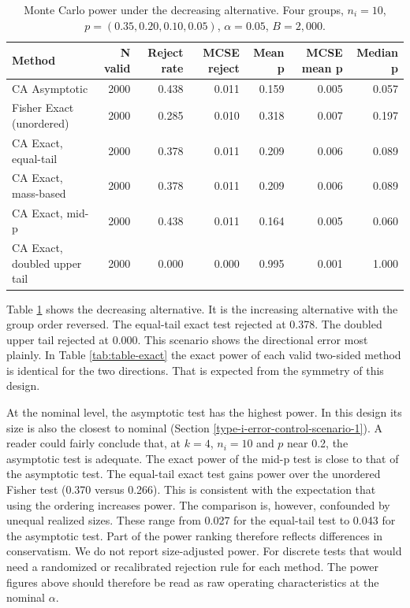 \documentclass[
  11pt,
]{article}
\begin{document}
\begin{table}[!h]
\centering
\caption{\label{tab:table-dec}Monte Carlo power under the decreasing alternative. Four groups, $n_i = 10$, $p = (0.35, 0.20, 0.10, 0.05)$, $\alpha = 0.05$, $B = 2{,}000$.}
\centering
\fontsize{9}{11}\selectfont
\begin{tabular}[t]{lrrrrrr}
\toprule
Method & N valid & Reject rate & MCSE reject & Mean p & MCSE mean p & Median p\\
\midrule
CA Asymptotic & 2000 & 0.438 & 0.011 & 0.159 & 0.005 & 0.057\\
Fisher Exact (unordered) & 2000 & 0.285 & 0.010 & 0.318 & 0.007 & 0.197\\
CA Exact, equal-tail & 2000 & 0.378 & 0.011 & 0.209 & 0.006 & 0.089\\
CA Exact, mass-based & 2000 & 0.378 & 0.011 & 0.209 & 0.006 & 0.089\\
CA Exact, mid-p & 2000 & 0.438 & 0.011 & 0.164 & 0.005 & 0.060\\
\addlinespace
CA Exact, doubled upper tail & 2000 & 0.000 & 0.000 & 0.995 & 0.001 & 1.000\\
\bottomrule
\end{tabular}
\end{table}

Table \ref{tab:table-dec} shows the decreasing
alternative. It is the increasing alternative with the
group order reversed. The equal-tail exact test rejected
at 0.378. The doubled upper tail rejected at
0.000. This scenario shows the directional error
most plainly. In Table \ref{tab:table-exact} the exact
power of each valid two-sided method is identical for the
two directions. That is expected from the symmetry of
this design.

At the nominal level, the asymptotic test has the highest
power. In this design its size is also the closest to
nominal (Section \ref{type-i-error-control-scenario-1}).
A reader could fairly conclude that, at \(k = 4\),
\(n_i = 10\) and \(p\) near 0.2, the asymptotic test is
adequate. The exact power of the mid-p test is close to
that of the asymptotic test. The equal-tail exact test
gains power over the unordered Fisher test
(0.370 versus 0.266). This is
consistent with the expectation that using the ordering
increases power. The comparison is, however, confounded
by unequal realized sizes. These range from 0.027
for the equal-tail test to 0.043 for the
asymptotic test. Part of the power ranking therefore
reflects differences in conservatism. We do not report
size-adjusted power. For discrete tests that would need a
randomized or recalibrated rejection rule for each
method. The power figures above should therefore be read
as raw operating characteristics at the nominal
\(\alpha\).
\end{document}
